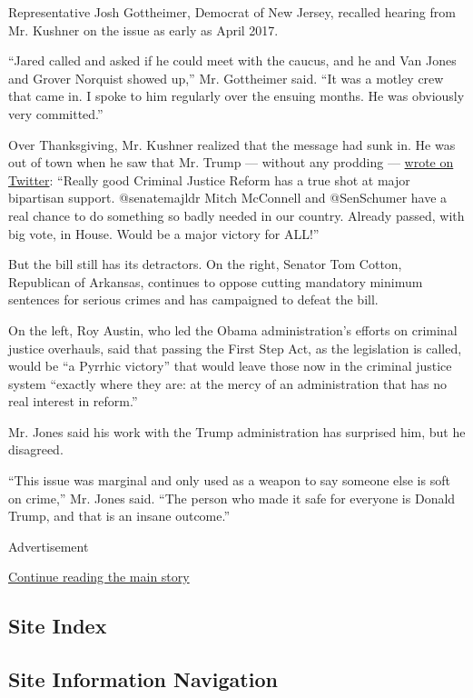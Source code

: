 Representative Josh Gottheimer, Democrat of New Jersey, recalled hearing
from Mr. Kushner on the issue as early as April 2017.

``Jared called and asked if he could meet with the caucus, and he and
Van Jones and Grover Norquist showed up,'' Mr. Gottheimer said. ``It was
a motley crew that came in. I spoke to him regularly over the ensuing
months. He was obviously very committed.''

Over Thanksgiving, Mr. Kushner realized that the message had sunk in. He
was out of town when he saw that Mr. Trump --- without any prodding ---
\href{https://twitter.com/realDonaldTrump/status/1066017112425185280}{wrote
on Twitter}: ``Really good Criminal Justice Reform has a true shot at
major bipartisan support. @senatemajldr Mitch McConnell and @SenSchumer
have a real chance to do something so badly needed in our country.
Already passed, with big vote, in House. Would be a major victory for
ALL!''

But the bill still has its detractors. On the right, Senator Tom Cotton,
Republican of Arkansas, continues to oppose cutting mandatory minimum
sentences for serious crimes and has campaigned to defeat the bill.

On the left, Roy Austin, who led the Obama administration's efforts on
criminal justice overhauls, said that passing the First Step Act, as the
legislation is called, would be ``a Pyrrhic victory'' that would leave
those now in the criminal justice system ``exactly where they are: at
the mercy of an administration that has no real interest in reform.''

Mr. Jones said his work with the Trump administration has surprised him,
but he disagreed.

``This issue was marginal and only used as a weapon to say someone else
is soft on crime,'' Mr. Jones said. ``The person who made it safe for
everyone is Donald Trump, and that is an insane outcome.''

Advertisement

\protect\hyperlink{after-bottom}{Continue reading the main story}

\hypertarget{site-index}{%
\subsection{Site Index}\label{site-index}}

\hypertarget{site-information-navigation}{%
\subsection{Site Information
Navigation}\label{site-information-navigation}}

